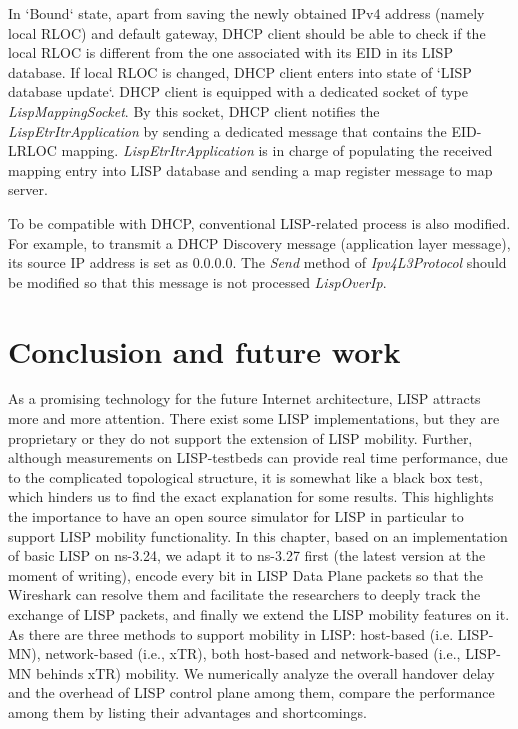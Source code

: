 In `Bound` state, apart from saving the newly obtained IPv4 address (namely local RLOC) and default gateway, DHCP client should be able to check if the local RLOC is different from the one associated with its EID in its LISP database.
If local RLOC is changed, DHCP client enters into state of `LISP database update`. DHCP client is equipped with a dedicated socket of type \emph{LispMappingSocket}. By this socket, DHCP client notifies the \emph{LispEtrItrApplication} by sending a dedicated message that contains the EID-LRLOC mapping. \emph{LispEtrItrApplication} is in charge of populating the received mapping entry into LISP database and sending a map register message to map server.

To be compatible with DHCP, conventional LISP-related process is also modified. For example, to transmit a DHCP Discovery message (application layer message), its source IP address is set as $0.0.0.0$. The \emph{Send} method of \emph{Ipv4L3Protocol} should be modified so that this message is not processed \emph{LispOverIp}.



\section{Conclusion and future work}
\label{sec:ns3_conclusion}
As a promising technology for the future Internet architecture, LISP attracts more and more attention. There exist some LISP implementations, but they are proprietary or they do not support the extension of LISP mobility. Further, although measurements on LISP-testbeds can provide real time performance, due to the complicated topological structure, it is somewhat like a black box test, which hinders us to find the exact explanation for some results. This highlights the importance to have an open source simulator for LISP in particular to support LISP mobility functionality. In this chapter, based on an implementation of basic LISP on ns-3.24, we adapt it to ns-3.27 first (the latest version at the moment of writing), encode every bit in LISP Data Plane packets so that the Wireshark can resolve them and facilitate the researchers to deeply track the exchange of LISP packets, and finally we extend the LISP mobility features on it. As there are three methods to support mobility in LISP: host-based (i.e. LISP-MN), network-based (i.e., xTR), both host-based and network-based (i.e., LISP-MN behinds xTR) mobility. We numerically analyze the overall handover delay and the overhead of LISP control plane among them, compare the performance among them by listing their advantages and shortcomings. %

